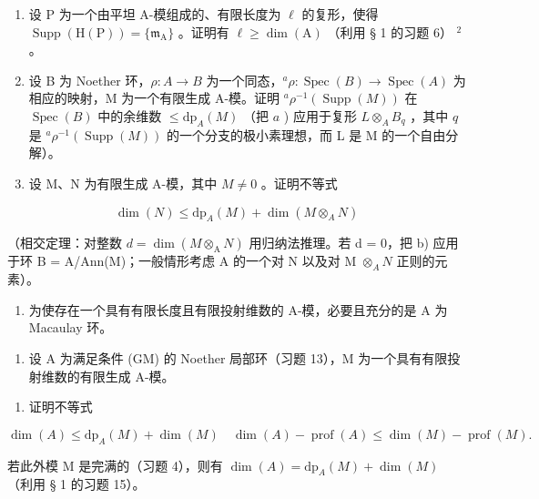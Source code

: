 \begin{enumerate}
\def\labelenumi{\alph{enumi})}
\item
  设 P 为一个由平坦 A-模组成的、有限长度为 \(\ell\) 的复形，使得 \(\operatorname{Supp}(\mathrm{H}(\mathrm{P})) = \{\mathfrak{m}_{\mathrm{A}}\}\) 。证明有 \(\ell \geqslant \dim(\mathrm{A})\) （利用 § 1 的习题 6） \(^2\) 。
\item
  设 B 为 Noether 环，\(\rho: A \to B\) 为一个同态，\(^a\rho: \operatorname{Spec}(B) \to \operatorname{Spec}(A)\) 为相应的映射，M 为一个有限生成 A-模。证明 \(^a\rho^{-1}(\operatorname{Supp}(M))\) 在 \(\operatorname{Spec}(B)\) 中的余维数 \(\leqslant \mathrm{dp}_A(M)\) （把 \(a\) ) 应用于复形 \(L \otimes_A B_q\) ，其中 \(q\) 是 \(^a\rho^{-1}(\operatorname{Supp}(M))\) 的一个分支的极小素理想，而 L 是 M 的一个自由分解）。
\item
  设 M、N 为有限生成 A-模，其中 \(M \neq 0\) 。证明不等式
\end{enumerate}

\[
\dim (N) \leqslant \mathrm{dp} _ {A} (M) + \dim (M \otimes_ {A} N)
\]

（相交定理：对整数 \(d = \dim(M \otimes_{\mathrm{A}} N)\) 用归纳法推理。若 d = 0，把 b) 应用于环 B = A/Ann(M)；一般情形考虑 A 的一个对 N 以及对 M \(\otimes_{A} N\) 正则的元素）。

\begin{enumerate}
\def\labelenumi{\alph{enumi})}
\setcounter{enumi}{3}
\tightlist
\item
  为使存在一个具有有限长度且有限投射维数的 A-模，必要且充分的是 A 为 Macaulay 环。
\end{enumerate}

\begin{enumerate}
\def\labelenumi{\arabic{enumi})}
\setcounter{enumi}{13}
\tightlist
\item
  设 \(\mathrm{A}\) 为满足条件 (GM) 的 Noether 局部环（习题 13），M 为一个具有有限投射维数的有限生成 A-模。
\end{enumerate}

\begin{enumerate}
\def\labelenumi{\alph{enumi})}
\tightlist
\item
  证明不等式
\end{enumerate}

\[
\dim (A) \leqslant \mathrm{dp} _ {A} (M) + \dim (M) \quad \dim (A) - \operatorname{prof} (A) \leqslant \dim (M) - \operatorname{prof} (M).
\]

若此外模 M 是完满的（习题 4），则有 \(\dim(A) = \mathrm{dp}_{A}(M) + \dim(M)\) （利用 § 1 的习题 15）。

